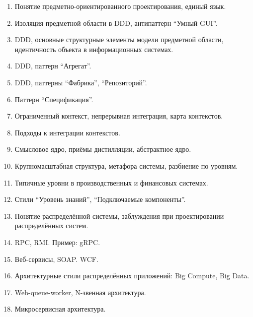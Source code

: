 \documentclass[a5paper]{article}
\begin{document}
\begin{enumerate}
    \item Понятие предметно-ориентированного проектирования, единый язык.
    \item Изоляция предметной области в DDD, антипаттерн \enquote{Умный GUI}.
    \item DDD, основные структурные элементы модели предметной области, идентичность объекта в информационных системах.
    \item DDD, паттерн \enquote{Агрегат}.
    \item DDD, паттерны \enquote{Фабрика}, \enquote{Репозиторий}.
    \item Паттерн \enquote{Спецификация}.
    \item Ограниченный контекст, непрерывная интеграция, карта контекстов.
    \item Подходы к интеграции контекстов.
    \item Смысловое ядро, приёмы дистилляции, абстрактное ядро.
    \item Крупномасштабная структура, метафора системы, разбиение по уровням. 
    \item Типичные уровни в производственных и финансовых системах.
    \item Стили \enquote{Уровень знаний}, \enquote{Подключаемые компоненты}.
    \item Понятие распределённой системы, заблуждения при проектировании распределённых систем.
    \item RPC, RMI. Пример: gRPC.
    \item Веб-сервисы, SOAP. WCF.
    \item Архитектурные стили распределённых приложений: Big Compute, Big Data.
    \item Web-queue-worker, N-звенная архитектура.
    \item Микросервисная архитектура.

\end{enumerate}
\end{document}
